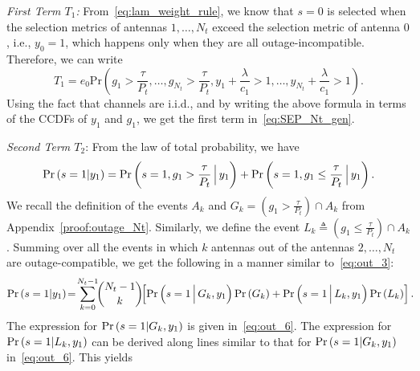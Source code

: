 \documentclass[12pt,draftcls,peerreview,onecolumn]{IEEEtran}
\newcommand{\brac}[1]{\left({#1}\right)}
\newcommand{\define}{\triangleq}
\newcommand{\ie}{{i.e.}}
\newcommand{\prob}[1]{\text{Pr}\brac{#1}}
\newcommand{\given}{\arrowvert}
\newcommand{\Given}{\Big\arrowvert}
\newcommand{\nck}[2]{\binom{#1}{#2}}
\newcommand{\setA}{A}
\newcommand{\setAk}{\setA_{k}}
\newcommand{\setG}{G}
\newcommand{\setL}{L}
\newcommand{\setGk}{\setG_k}
\newcommand{\setLk}{\setL_k}
\newcommand{\lam}{\lambda}
\newcommand{\termone}{T_1}
\newcommand{\termtwo}{T_2}
\newcommand{\Nt}{{N_t}}
\newcommand{\Pt}{{P_t}}
\newcommand{\puch}{g}
\newcommand{\gk}[1]{{\puch_{#1}}}
\newcommand{\itau}{\tau}
\newcommand{\cone}{c_{1}}
\newcommand{\taubypt}{\frac{\itau}{\Pt}}
\newcommand{\gkgrtaubypt}[1]{{\gk{#1}}>\taubypt}
\newcommand{\gklttaubypt}[1]{{\gk{#1}}\leq\taubypt}
\newcommand{\lambym}{\frac{\lam}{\cone}}
\newcommand{\yk}[1]{y_{#1}}
\newcommand{\zerosep}{e_0}
\begin{document}
{\em First Term $\termone$:}
From~\eqref{eq:lam_weight_rule}, we know that ${s=0}$ is selected when the selection metrics of antennas $1,\ldots,\Nt$ exceed the selection metric of antenna $0$, \ie, $\yk{0}=1$, which happens only when they are all outage-incompatible. Therefore, we can write%
\begin{equation}
\termone = \zerosep\prob{\gkgrtaubypt{1},\dots,\gkgrtaubypt{\Nt}, \yk{1}\!+\!\lambym >1,\ldots,\yk{\Nt}\!+\!\lambym >1}.
\label{eq:termone_a}
\end{equation}
%
Using the fact that channels are i.i.d., and by writing the above formula in terms of the CCDFs of $\yk{1}$ and $\gk{1}$, we get the first term in~\eqref{eq:SEP_Nt_gen}.


{\em Second Term $\termtwo$}: From the law of total probability, we have 
%
\begin{equation}
\prob{s = 1\given \yk{1}} = \prob{s = 1,\gk{1}>\taubypt\Given\yk{1}}  + \prob{s = 1,\gk{1}\leq\taubypt\Given \yk{1}}. 
\label{eq:pr_s_1}
\end{equation}
%
We recall  the definition of the events $\setAk$ and   $\setGk=\left(\gkgrtaubypt{1}\right)\cap\setAk$ from Appendix~\ref{proof:outage_Nt}. Similarly, we define the event $\setLk\define\left(\gklttaubypt{1}\right)\cap\setAk $. Summing over all the events in which $k$ antennas out of the antennas $2,\ldots,\Nt$ are outage-compatible, we get the following in a manner similar to~\eqref{eq:out_3}:
\begin{equation}
\prob{s = 1\given \yk{1}} \! =\! \sum_{k=0}^{\Nt-1}\!\!\nck{\Nt-1}{k}\!\! 
\left[ \prob{s = 1 \Given \setGk , \yk{1}} \prob{\setGk} +  \prob{s = 1 \Given \setLk, \yk{1}} \prob{\setLk}\right].\!\! 
\label{eq:pr_s_1_2}
\end{equation}
% 
%
The expression for $\prob{s = 1\given \setGk, \yk{1}}$ is given in~\eqref{eq:out_6}.  The expression for $\prob{s = 1\given \setLk, \yk{1}}$ can be derived along lines similar to that for $\prob{s = 1\given \setGk, \yk{1}}$ in~\eqref{eq:out_6}. This yields   
\end{document}

